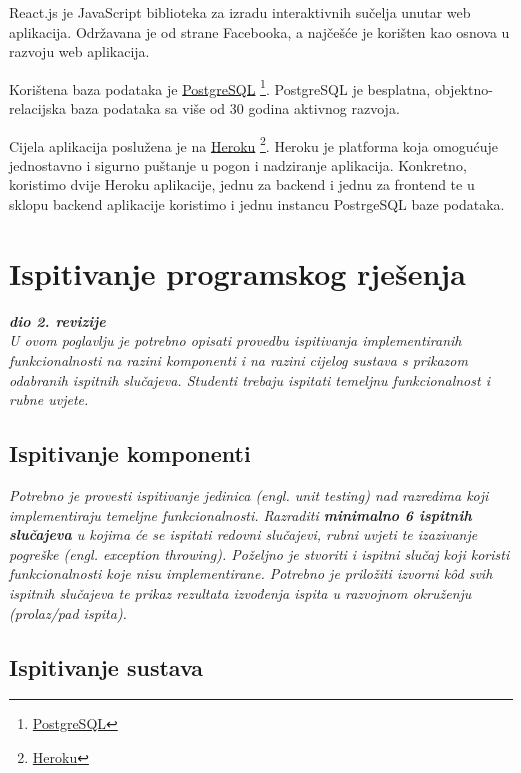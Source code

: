             React.js je JavaScript biblioteka za izradu interaktivnih sučelja unutar web aplikacija. Održavana je od strane Facebooka, a najčešće je korišten kao osnova u razvoju web aplikacija.
            
            Korištena baza podataka je \underline{PostgreSQL} \footnote{\href{https://www.postgresql.org/}{PostgreSQL}}. PostgreSQL je besplatna, objektno-relacijska baza podataka sa više od 30 godina aktivnog razvoja.
            
            Cijela aplikacija poslužena je na \underline{Heroku} \footnote{\href{https://www.heroku.com/home}{Heroku}}. Heroku je platforma koja omogućuje jednostavno i sigurno puštanje  u pogon i nadziranje aplikacija. Konkretno, koristimo dvije Heroku aplikacije, jednu za backend i jednu za frontend te u sklopu backend aplikacije koristimo i jednu instancu PostrgeSQL baze podataka.
			
			\eject 
		
	
		\section{Ispitivanje programskog rješenja}
			
			\textbf{\textit{dio 2. revizije}}\\
			
			 \textit{U ovom poglavlju je potrebno opisati provedbu ispitivanja implementiranih funkcionalnosti na razini komponenti i na razini cijelog sustava s prikazom odabranih ispitnih slučajeva. Studenti trebaju ispitati temeljnu funkcionalnost i rubne uvjete.}
	
			
			\subsection{Ispitivanje komponenti}
			\textit{Potrebno je provesti ispitivanje jedinica (engl. unit testing) nad razredima koji implementiraju temeljne funkcionalnosti. Razraditi \textbf{minimalno 6 ispitnih slučajeva} u kojima će se ispitati redovni slučajevi, rubni uvjeti te izazivanje pogreške (engl. exception throwing). Poželjno je stvoriti i ispitni slučaj koji koristi funkcionalnosti koje nisu implementirane. Potrebno je priložiti izvorni kôd svih ispitnih slučajeva te prikaz rezultata izvođenja ispita u razvojnom okruženju (prolaz/pad ispita). }
			
			
			
			\subsection{Ispitivanje sustava}
			
